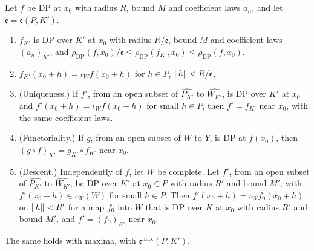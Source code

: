 \begin{theorem}[DP germs]\label{dp:thm:germ-base-change}
Let $f$ be DP at $x_0$ with radius $R$, bound $M$ and coefficient laws $a_n$, and let $\mathfrak e=\mathfrak e(P,K')$.
\begin{enumerate}
\item $f_{K'}$ is DP over $K'$ at $x_0$ with radius $R/\mathfrak e$, bound $M$ and coefficient laws $(a_n)_{K'}$, and $\rho_{\mathrm{DP}}(f,x_0)/\mathfrak e\le\rho_{\mathrm{DP}}(f_{K'},x_0)\le\rho_{\mathrm{DP}}(f,x_0)$.
\item $f_{K'}(x_0+h)=\iota_Wf(x_0+h)$ for $h\in P$, $\lVert h\rVert<R/\mathfrak e$.
\item \textup{(Uniqueness.)} If $f'$, from an open subset of $\widehat{P_{K'}}$ to $\widehat{W_{K'}}$, is DP over $K'$ at $x_0$ and $f'(x_0+h)=\iota_Wf(x_0+h)$ for small $h\in P$, then $f'=f_{K'}$ near $x_0$, with the same coefficient laws.
\item \textup{(Functoriality.)} If $g$, from an open subset of $W$ to $Y$, is DP at $f(x_0)$, then $(g\circ f)_{K'}=g_{K'}\circ f_{K'}$ near $x_0$.
\item \textup{(Descent.)} Independently of $f$, let $W$ be complete. Let $f'$, from an open subset of $\widehat{P_{K'}}$ to $\widehat{W_{K'}}$, be DP over $K'$ at $x_0\in P$ with radius $R'$ and bound $M'$, with $f'(x_0+h)\in\iota_W(W)$ for small $h\in P$. Then $f'(x_0+h)=\iota_Wf_0(x_0+h)$ on $\lVert h\rVert<R'$ for a map $f_0$ into $W$ that is DP over $K$ at $x_0$ with radius $R'$ and bound $M'$, and $f'=(f_0)_{K'}$ near $x_0$.
\end{enumerate}
The same holds with maxima, with $\mathfrak e^{\max}(P,K')$.
\end{theorem}

